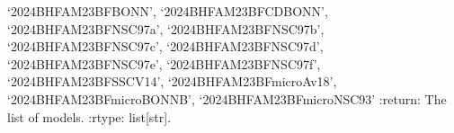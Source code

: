 \documentclass[letterpaper,10pt,english]{sphinxmanual}
\begin{document}
\begin{fulllineitems}
‘2024\sphinxhyphen{}BHF\sphinxhyphen{}AM\sphinxhyphen{}23BF\sphinxhyphen{}BONN’, ‘2024\sphinxhyphen{}BHF\sphinxhyphen{}AM\sphinxhyphen{}23BF\sphinxhyphen{}CDBONN’,     ‘2024\sphinxhyphen{}BHF\sphinxhyphen{}AM\sphinxhyphen{}23BF\sphinxhyphen{}NSC97a’, ‘2024\sphinxhyphen{}BHF\sphinxhyphen{}AM\sphinxhyphen{}23BF\sphinxhyphen{}NSC97b’, ‘2024\sphinxhyphen{}BHF\sphinxhyphen{}AM\sphinxhyphen{}23BF\sphinxhyphen{}NSC97c’, ‘2024\sphinxhyphen{}BHF\sphinxhyphen{}AM\sphinxhyphen{}23BF\sphinxhyphen{}NSC97d’,     ‘2024\sphinxhyphen{}BHF\sphinxhyphen{}AM\sphinxhyphen{}23BF\sphinxhyphen{}NSC97e’, ‘2024\sphinxhyphen{}BHF\sphinxhyphen{}AM\sphinxhyphen{}23BF\sphinxhyphen{}NSC97f’, ‘2024\sphinxhyphen{}BHF\sphinxhyphen{}AM\sphinxhyphen{}23BF\sphinxhyphen{}SSCV14’,    ‘2024\sphinxhyphen{}BHF\sphinxhyphen{}AM\sphinxhyphen{}23BFmicro\sphinxhyphen{}Av18’, ‘2024\sphinxhyphen{}BHF\sphinxhyphen{}AM\sphinxhyphen{}23BFmicro\sphinxhyphen{}BONNB’, ‘2024\sphinxhyphen{}BHF\sphinxhyphen{}AM\sphinxhyphen{}23BFmicro\sphinxhyphen{}NSC93’
:return: The list of models.
:rtype: list{[}str{]}.

\end{fulllineitems}


\begin{fulllineitems}
\label{\detokenize{source/api/setup_eos_micro:nucleardatapy.setup_eos_micro.eos_micro_models_group_NM}}
\pysigstartsignatures
\pysiglinewithargsret
{}
{}
{}
\pysigstopsignatures
\end{fulllineitems}


\begin{fulllineitems}
\label{\detokenize{source/api/setup_eos_micro:nucleardatapy.setup_eos_micro.eos_micro_models_group_SM}}
\pysigstartsignatures
\pysiglinewithargsret
{}
{}
{}
\pysigstopsignatures
\end{fulllineitems}
\end{document}
